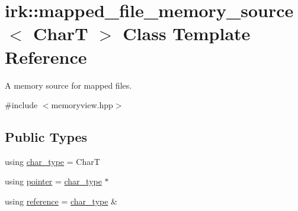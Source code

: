 \hypertarget{classirk_1_1mapped__file__memory__source}{}\section{irk\+:\+:mapped\+\_\+file\+\_\+memory\+\_\+source$<$ CharT $>$ Class Template Reference}
\label{classirk_1_1mapped__file__memory__source}


A memory source for mapped files.  




{\ttfamily \#include $<$memoryview.\+hpp$>$}

\subsection*{Public Types}
\begin{DoxyCompactItemize}
\item 
using \mbox{\hyperlink{classirk_1_1mapped__file__memory__source_a9b4319787fae825c6a27be1e58447386}{char\+\_\+type}} = CharT
\item 
using \mbox{\hyperlink{classirk_1_1mapped__file__memory__source_ada63505be1b6881458e74592a2a4f236}{pointer}} = \mbox{\hyperlink{classirk_1_1mapped__file__memory__source_a9b4319787fae825c6a27be1e58447386}{char\+\_\+type}} $\ast$
\item 
using \mbox{\hyperlink{classirk_1_1mapped__file__memory__source_a4a2510b01a3bf4c3570617707b069bd6}{reference}} = \mbox{\hyperlink{classirk_1_1mapped__file__memory__source_a9b4319787fae825c6a27be1e58447386}{char\+\_\+type}} \&
\end{DoxyCompactItemize}
